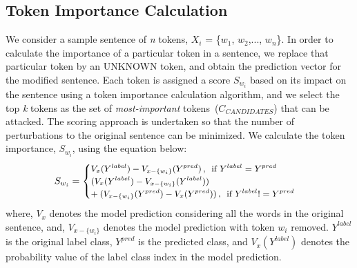 \documentclass[sigconf]{acmart}
\begin{document}
\subsection{Token Importance Calculation}
We consider a sample sentence of \textit{n} tokens, $X_i$ = \{$w_1$, $w_2$,..., $w_n$\}. In order to calculate the importance of a particular token in a sentence, we replace that particular token by an UNKNOWN token, and obtain the prediction vector for the modified sentence. 
Each token is assigned a score $S_{w_i}$ based on its impact on the sentence using a token importance calculation algorithm, and we select the top \textit{k} tokens as the set of \textit{most-important} tokens~($C_{CANDIDATES}$) that can be attacked. The scoring approach is undertaken so that the number of perturbations to the original sentence can be minimized. 
We calculate the token importance, $S_{w_i}$, using the equation below:
\begin{equation*}
\small
\label{eq:words_importance}
    S_{w_i}=
    \begin{cases}
      V_x(Y^{label})- V_{x-\{w_i\}}(Y^{pred})\,,\enspace \text{if}\ Y^{label}=Y^{pred} \\
      (V_x(Y^{label})-V_{x-\{w_i\}}(Y^{label}))\\ +\:(V_{x-\{w_i\}}(Y^{pred})-V_x(Y^{pred}))\,,\enspace\text{if}\ Y^{label}!=Y^{pred}
      
    \end{cases}
\end{equation*}
where, $V_x$ denotes the model prediction considering all the words in the original sentence, and, $V_{x-\{w_i\}}$ denotes the model prediction with token $w_i$ removed. $Y^{label}$ is the original label class, $Y^{pred}$ is the predicted class, and $V_x(Y^{label})$ denotes the probability value of the label class index in the model prediction.
\end{document}
